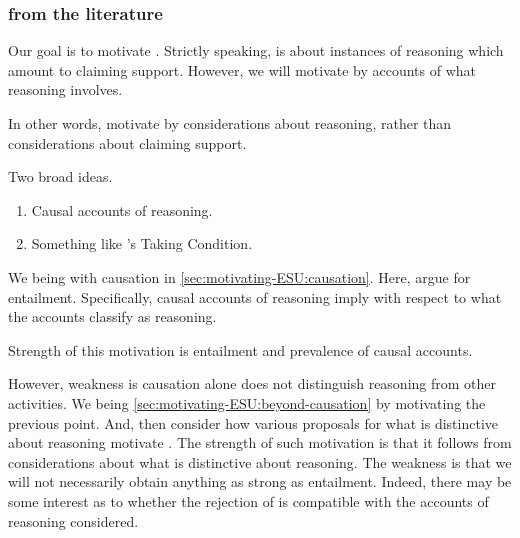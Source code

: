 \subsubsection{\ESU{} from the literature}

\begin{note}
  Our goal is to motivate \ESU{}.
  Strictly speaking, \ESU{} is about instances of reasoning which amount to claiming support.
  However, we will motivate \ESU{} by accounts of what reasoning involves.

  In other words, motivate \ESU{} by considerations about reasoning, rather than considerations about claiming support.

  Two broad ideas.
  \begin{enumerate}
  \item Causal accounts of reasoning.
  \item Something like \citeauthor{Boghossian:2014aa}'s Taking Condition.
  \end{enumerate}

  We being with causation in \autoref{sec:motivating-ESU:causation}.
  Here, argue for entailment.
  Specifically, causal accounts of reasoning imply \ESU{} with respect to what the accounts classify as reasoning.

  Strength of this motivation is entailment and prevalence of causal accounts.

  However, weakness is causation alone does not distinguish reasoning from other activities.
  We being \autoref{sec:motivating-ESU:beyond-causation} by motivating the previous point.
  And, then consider how various proposals for what is distinctive about reasoning motivate \ESU{}.
  The strength of such motivation is that it follows from considerations about what is distinctive about reasoning.
  The weakness is that we will not necessarily obtain anything as strong as entailment.
  Indeed, there may be some interest as to whether the rejection of \ESU{} is compatible with the accounts of reasoning considered.
\end{note}

